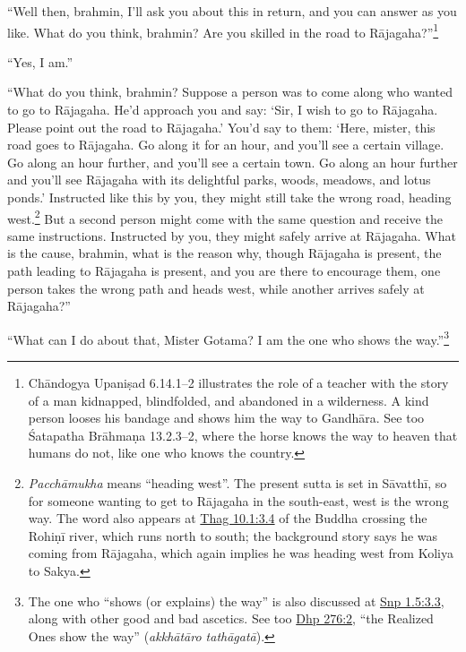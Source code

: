 \documentclass[12pt,openany]{book}%
\begin{document}
“Well then, brahmin, I’ll ask you about this in return, and you can answer as you like. What do you think, brahmin? Are you skilled in the road to \textsanskrit{Rājagaha}?”\footnote{\textsanskrit{Chāndogya} \textsanskrit{Upaniṣad} 6.14.1–2 illustrates the role of a teacher with the story of a man kidnapped, blindfolded, and abandoned in a wilderness. A kind person looses his bandage and shows him the way to \textsanskrit{Gandhāra}. See too Śatapatha \textsanskrit{Brāhmaṇa} 13.2.3–2, where the horse knows the way to heaven that humans do not, like one who knows the country. } 

“Yes, I am.” 

“What do you think, brahmin? Suppose a person was to come along who wanted to go to \textsanskrit{Rājagaha}. He’d approach you and say: ‘Sir, I wish to go to \textsanskrit{Rājagaha}. Please point out the road to \textsanskrit{Rājagaha}.’ You’d say to them: ‘Here, mister, this road goes to \textsanskrit{Rājagaha}. Go along it for an hour, and you’ll see a certain village. Go along an hour further, and you’ll see a certain town. Go along an hour further and you’ll see \textsanskrit{Rājagaha} with its delightful parks, woods, meadows, and lotus ponds.’ Instructed like this by you, they might still take the wrong road, heading west.\footnote{\textit{\textsanskrit{Pacchāmukha}} means “heading west”. The present sutta is set in \textsanskrit{Sāvatthī}, so for someone wanting to get to \textsanskrit{Rājagaha} in the south-east, west is the wrong way. The word also appears at \href{https://suttacentral.net/thag10.1/en/sujato\#3.4}{Thag 10.1:3.4} of the Buddha crossing the \textsanskrit{Rohiṇī} river, which runs north to south; the background story says he was coming from \textsanskrit{Rājagaha}, which again implies he was heading west from Koliya to Sakya. } But a second person might come with the same question and receive the same instructions. Instructed by you, they might safely arrive at \textsanskrit{Rājagaha}. What is the cause, brahmin, what is the reason why, though \textsanskrit{Rājagaha} is present, the path leading to \textsanskrit{Rājagaha} is present, and you are there to encourage them, one person takes the wrong path and heads west, while another arrives safely at \textsanskrit{Rājagaha}?” 

“What can I do about that, Mister Gotama? I am the one who shows the way.”\footnote{The one who “shows (or explains) the way” is also discussed at \href{https://suttacentral.net/snp1.5/en/sujato\#3.3}{Snp 1.5:3.3}, along with other good and bad ascetics. See too \href{https://suttacentral.net/dhp276/en/sujato\#2}{Dhp 276:2}, “the Realized Ones show the way” (\textit{\textsanskrit{akkhātāro} \textsanskrit{tathāgatā}}). } 
\end{document}
